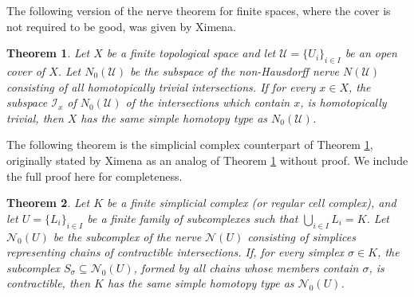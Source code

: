 \documentclass[12pt,a4paper,twoside, reqno, tbtags]{article}
\numberwithin{equation}{section}
\newtheorem{theorem}{Theorem}[section]
\begin{document}
    \noindent The following version of the nerve theorem for finite spaces, where the cover is not required to be good, was given by Ximena.
\begin{theorem}\cite{Ximena}\label{20}
	Let $X$ be a finite topological space and let $\mathcal{U} = \{U_i\}_{i \in I}$ be an open cover of $X$. Let $N_0(\mathcal{U})$ be the subspace of the non-Hausdorff nerve $N(\mathcal{U})$ consisting of all homotopically trivial intersections. If for every $x \in X$, the subspace $\mathcal{I}_x$ of $N_0(\mathcal{U})$ of the intersections which contain $x$, is homotopically trivial, then $X$ has the same simple homotopy type as $N_0(\mathcal{U})$.
\end{theorem}
\noindent The following theorem is the simplicial complex counterpart of Theorem \ref{20}, originally stated by Ximena as an analog of Theorem \ref{20} without proof. We include the full proof here for completeness.
\begin{theorem}\label{25'}\cite{Ximena}
	Let \( K \) be a finite simplicial complex (or regular cell complex), and let \( U = \{ L_i \}_{i \in I} \) be a finite family of subcomplexes such that \( \bigcup_{i \in I} L_i = K \). Let \( \mathcal{N}_0(U) \) be the subcomplex of the nerve \( \mathcal{N}(U) \) consisting of simplices representing chains of contractible intersections. If, for every simplex \( \sigma \in K \), the subcomplex \( S_\sigma \subseteq \mathcal{N}_0(U) \), formed by all chains whose members contain \( \sigma \), is contractible, then \( K \) has the same simple homotopy type as \( \mathcal{N}_0(U) \).
\end{theorem}
\end{document}

